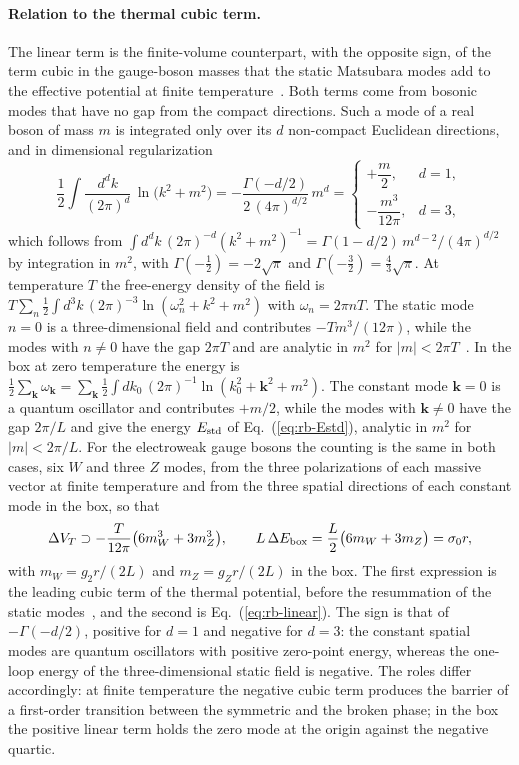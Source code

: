 \paragraph{Relation to the thermal cubic term.}
The linear term is the finite-volume counterpart, with the opposite sign, of the term cubic in the gauge-boson masses that the static Matsubara modes add to the effective potential at finite temperature~\cite{Dine:1992wr,Arnold:1992rz}.
Both terms come from bosonic modes that have no gap from the compact directions.
Such a mode of a real boson of mass $m$ is integrated only over its $d$ non-compact Euclidean directions, and in dimensional regularization
\begin{equation}
\frac12\int\!\frac{d^dk}{(2\pi)^d}\,\ln\bigl(k^2+m^2\bigr)=-\frac{\Gamma(-d/2)}{2\,(4\pi)^{d/2}}\,m^d
=\begin{cases}+\dfrac{m}{2}, & d=1,\\[8pt] -\dfrac{m^3}{12\pi}, & d=3,\end{cases}
\label{eq:v11-gapless}
\end{equation}
which follows from $\int d^dk\,(2\pi)^{-d}(k^2+m^2)^{-1}=\Gamma(1-d/2)\,m^{d-2}/(4\pi)^{d/2}$ by integration in $m^2$, with $\Gamma(-\frac12)=-2\sqrt\pi$ and $\Gamma(-\frac32)=\frac43\sqrt\pi$.
At temperature $T$ the free-energy density of the field is $T\sum_n\frac12\int d^3k\,(2\pi)^{-3}\ln(\omega_n^2+k^2+m^2)$ with $\omega_n=2\pi nT$.
The static mode $n=0$ is a three-dimensional field and contributes $-Tm^3/(12\pi)$, while the modes with $n\neq0$ have the gap $2\pi T$ and are analytic in $m^2$ for $|m|<2\pi T$~\cite{Dine:1992wr}.
In the box at zero temperature the energy is $\frac12\sum_{\bm k}\omega_{\bm k}=\sum_{\bm k}\frac12\int dk_0\,(2\pi)^{-1}\ln(k_0^2+\bm k^2+m^2)$.
The constant mode $\bm k=0$ is a quantum oscillator and contributes $+m/2$, while the modes with $\bm k\neq0$ have the gap $2\pi/L$ and give the energy $E_{\rm std}$ of Eq.~(\ref{eq:rb-Estd}), analytic in $m^2$ for $|m|<2\pi/L$.
For the electroweak gauge bosons the counting is the same in both cases, six $W$ and three $Z$ modes, from the three polarizations of each massive vector at finite temperature and from the three spatial directions of each constant mode in the box, so that
\begin{equation}
\Delta V_T\supset-\frac{T}{12\pi}\bigl(6m_W^3+3m_Z^3\bigr),\qquad
L\,\Delta E_{\rm box}=\frac L2\bigl(6m_W+3m_Z\bigr)=\sigma_0r,
\label{eq:v11-cubic-linear}
\end{equation}
with $m_W=g_2r/(2L)$ and $m_Z=g_Zr/(2L)$ in the box.
The first expression is the leading cubic term of the thermal potential, before the resummation of the static modes~\cite{Arnold:1992rz}, and the second is Eq.~(\ref{eq:rb-linear}).
The sign is that of $-\Gamma(-d/2)$, positive for $d=1$ and negative for $d=3$: the constant spatial modes are quantum oscillators with positive zero-point energy, whereas the one-loop energy of the three-dimensional static field is negative.
The roles differ accordingly: at finite temperature the negative cubic term produces the barrier of a first-order transition between the symmetric and the broken phase; in the box the positive linear term holds the zero mode at the origin against the negative quartic.

